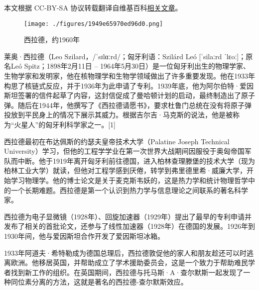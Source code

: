 
本文根据 CC-BY-SA 协议转载翻译自维基百科\href{https://en.wikipedia.org/wiki/Leo_Szilard}{相关文章}。

\begin{figure}[ht]
\centering
\texttt{[image: ./figures/1949e65970ed96d0.png]}
\caption{西拉德，约1960年} \label{fig_Szilar_1}
\end{figure}
莱奥·西拉德（Leo Szilard，/ˈsɪlɑːrd/；匈牙利语：Szilárd Leó [ˈsilaːrd ˈlɛoː]；原名Leó Spitz；1898年2月11日 – 1964年5月30日）是一位匈牙利出生的物理学家、生物学家和发明家，他在核物理学和生物学领域做出了许多重要发现。他在1933年构思了核链式反应，并于1936年为此申请了专利。1939年底，他为阿尔伯特·爱因斯坦签署的信件起草了内容，这封信促成了曼哈顿计划的启动，最终制造出了原子弹。随后在1944年，他撰写了《西拉德请愿书》，要求杜鲁门总统在没有将原子弹投放到平民身上的情况下展示其威力。根据吉尔吉·马克斯的说法，他是被称为“火星人”的匈牙利科学家之一。[1]

西拉德最初在布达佩斯的约瑟夫皇帝技术大学（Palatine Joseph Technical University）学习，但他的工程学学业在第一次世界大战期间因服役于奥匈帝国军队而中断。他于1919年离开匈牙利前往德国，进入柏林查理滕堡的技术大学（现为柏林工业大学）就读，但他对工程学感到厌倦，转学到弗里德里希·威廉大学，开始学习物理学。他的博士论文是关于麦克斯韦妖的，这是热力学和统计物理哲学中的一个长期难题。西拉德是第一个认识到热力学与信息理论之间联系的著名科学家。

西拉德为电子显微镜（1928年）、回旋加速器（1929年）提出了最早的专利申请并发布了相关的首批论文，还参与了线性加速器（1928年）在德国的发展。1926年到1930年间，他与爱因斯坦合作开发了爱因斯坦冰箱。

1933年阿道夫·希特勒成为德国总理后，西拉德敦促他的家人和朋友趁还可以时逃离欧洲。他移居英国，并帮助成立了学术援助委员会，这是一个致力于帮助难民学者找到新工作的组织。在英国期间，西拉德与托马斯·A·查尔默斯一起发现了一种同位素分离的方法，这就是著名的西拉德-查尔默斯效应。